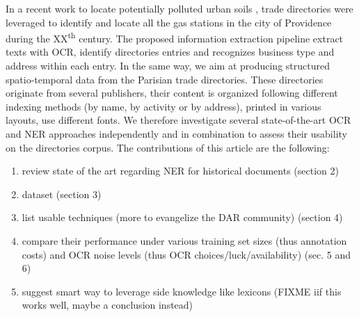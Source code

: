 In a recent work to locate potentially polluted urban soils \cite{bell2020automated}, trade directories were leveraged to identify and locate all the gas stations in the city of Providence during the XX\textsuperscript{th} century.
The proposed information extraction pipeline extract texts with OCR, identify directories entries and recognizes business type and address within each entry.
In the same way, we aim at producing structured spatio-temporal data from the Parisian trade directories.
These directories originate from several publishers, their content is organized following different indexing methods (by name, by activity or by address), printed in various layouts, use different fonts.
We therefore investigate several state-of-the-art OCR and NER approaches independently and in combination to assess their usability on the directories corpus.
The contributions of this article are the following:
\begin{enumerate}
    \item review state of the art regarding NER for historical documents (section 2)
    \item dataset (section 3)
    \item list usable techniques (more to evangelize the DAR community) (section 4)
    \item compare their performance under various training set sizes (thus annotation costs) and OCR noise levels (thus OCR choices/luck/availability) (sec. 5 and 6)
    \item suggest smart way to leverage side knowledge like lexicons (FIXME iif this works well, maybe a conclusion instead)
\end{enumerate}


